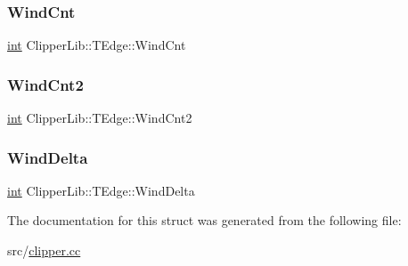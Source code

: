 \subsubsection{\texorpdfstring{WindCnt}{WindCnt}}
{\footnotesize\ttfamily \mbox{\hyperlink{draw_8hh_aa620a13339ac3a1177c86edc549fda9b}{int}} Clipper\+Lib\+::\+T\+Edge\+::\+Wind\+Cnt}

\mbox{\label{struct_clipper_lib_1_1_t_edge_a50ccbb54513e60a39132dfca7c9b40f4}} 
\subsubsection{\texorpdfstring{WindCnt2}{WindCnt2}}
{\footnotesize\ttfamily \mbox{\hyperlink{draw_8hh_aa620a13339ac3a1177c86edc549fda9b}{int}} Clipper\+Lib\+::\+T\+Edge\+::\+Wind\+Cnt2}

\mbox{\label{struct_clipper_lib_1_1_t_edge_afd72e2c7b9f97706ead72907509f8bc1}} 
\subsubsection{\texorpdfstring{WindDelta}{WindDelta}}
{\footnotesize\ttfamily \mbox{\hyperlink{draw_8hh_aa620a13339ac3a1177c86edc549fda9b}{int}} Clipper\+Lib\+::\+T\+Edge\+::\+Wind\+Delta}



The documentation for this struct was generated from the following file\+:\begin{DoxyCompactItemize}
\item 
src/\mbox{\hyperlink{clipper_8cc}{clipper.\+cc}}\end{DoxyCompactItemize}
